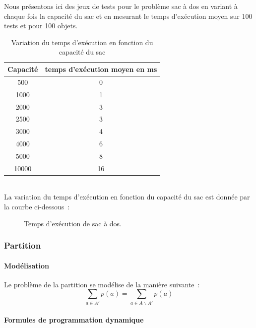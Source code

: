 \documentclass[a4paper, 12pt]{article}
\begin{document}
Nous présentons ici des jeux de tests pour le problème sac à dos en variant à chaque fois la capacité du sac et en mesurant le temps d'exécution moyen sur 100 tests et pour 100 objets.
\begin{table}[h!]
\centering
\begin{tabular}{|c|c|}
\hline
Capacité & temps d'exécution moyen en ms\\
\hline
500 & 0\\
\hline
1000 & 1\\
\hline
2000 & 3\\
\hline
2500 & 3\\
\hline
3000 & 4\\
\hline
4000 & 6\\
\hline
5000 & 8\\
\hline
10000 & 16\\
\hline
\end{tabular}
\caption {Variation du temps d'exécution en fonction du capacité du sac}
\end{table}\\
La variation du temps d'exécution en fonction du capacité du sac est donnée par la courbe ci-dessous~:
\begin{figure}[h!]
\centering
{}
\caption{Temps d'exécution de sac à dos.}
\end{figure}

\subsubsection{Partition}

\paragraph{Modélisation}

Le problème de la partition se modélise de la manière suivante~:
\begin{equation}
\sum_{a \in A'} p(a)= \sum_{a \in A
    \backslash A'}p(a)
\end{equation}

\paragraph{Formules de programmation dynamique}
\end{document}
